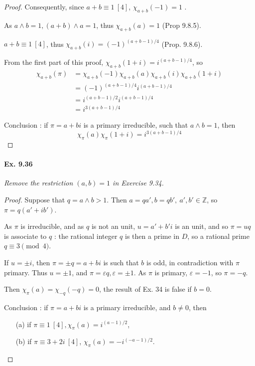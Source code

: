 \documentclass[11pt,a4paper]{article}
\newcommand{\Z}{\mathbb{Z}}
\begin{document}
\begin{proof}
Consequently, since $a+b \equiv 1 \ [4]$, $\chi_{a+b}(-1) = 1$ .

As $a\wedge b = 1, (a+b) \wedge a = 1$, thus $\chi_{a+b}(a) = 1$ (Prop 9.8.5).

$a+b \equiv 1\ [4]$, thus $\chi_{a+b}(i) = (-1)^{(a+b-1)/4}$ (Prop. 9.8.6).

From the first part of this proof, $\chi_{a+b}(1+i) = i^{(a+b-1)/4}$, so
\begin{align*}
 \chi_{a+b}(\pi) &= \chi_{a+b}(-1) \chi_{a+b}(a) \chi_{a+b}(i) \chi_{a+b}(1+i)\\
 &=(-1)^{(a+b-1)/4} i ^{(a+b-1)/4}\\
 &=i^{(a+b-1)/2} i ^{(a+b-1)/4}\\
 &=i^{3(a+b-1)/4}
 \end{align*}
 
 Conclusion : if $\pi = a+b i$ is a primary irreducible, such that $a\wedge b=1$, then $$\chi_{\pi}(a) \chi_{\pi}(1+i) = i^{3(a+b-1)/4}$$
\end{proof} 

\paragraph{Ex. 9.36}

{\it Remove the restriction $(a,b)=1$ in Exercise 9.34.
}

\begin{proof}
Suppose that $q = a\wedge b >1$. Then $a = qa',b = qb', \ a',b' \in \Z$, so $\pi = q(a'+ib')$.

As $\pi$ is irreducible, and as $q$ is not an unit, $u = a'+b'i$ is an unit, and so $\pi = uq$ is associate to $q$ : the rational integer $q$ is then a prime in $D$, so a rational prime $q \equiv 3 \pmod 4$.

If $u = \pm i$, then $\pi = \pm q = a + bi$ is such that $b$ is odd, in contradiction with $\pi$ primary. Thus $u = \pm 1$, and $\pi = \varepsilon q, \varepsilon = \pm 1$. As $\pi$ is primary, $\varepsilon = -1$, so $\pi = -q$.

Then $\chi_\pi(a) = \chi_{-q}(-q) = 0$, the result of Ex. 34 is false if $b=0$.

Conclusion : if $\pi = a+bi$ is a primary irreducible, and $b\neq 0$, then 
\begin{enumerate}
\item[(a)] if $\pi \equiv 1 \ [4], \chi_\pi(a) = i^{(a-1)/2}$,
\item[(b)] if $\pi \equiv 3+2i\ [4]$, $\chi_\pi(a) = -i^{(-a-1)/2}$.
\end{enumerate}
\end{proof}
\end{document}
